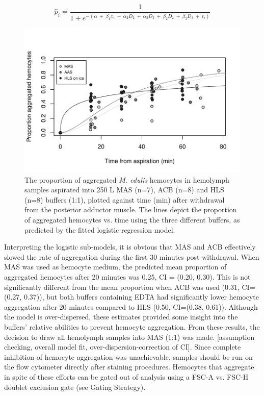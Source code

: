 \begin{equation}
\label{eq:logit}
\hat{p}_{i} = \dfrac{1}{1 + e^{-(\alpha \: + \: \beta_{1} x_{i} \: + \: \alpha_{2} D_{2} \: + \: \alpha_{3} D_{3} \: + \: \beta_{2} D_{2} \: + \: \beta_{3} D_{3} \: + \: \epsilon_{i})}}
\end{equation}

\begin{figure}[!ht]
    \centering
    \includegraphics[width=1.0\textwidth]{figures/greys368.pdf}
    \caption{The proportion of aggregated \emph{M. edulis} hemocytes in hemolymph samples aspirated into 250 \micro L MAS (n=7), ACB (n=8) and HLS (n=8) buffers (1:1), plotted against time (min) after withdrawal from the posterior adductor muscle. The lines depict the proportion of aggregated hemocytes vs. time using the three different buffers, as predicted by the fitted logistic regression model.}
    \label{fig:aggregation}
\end{figure}

Interpreting the logistic sub-models, it is obvious that MAS and ACB effectively slowed the rate of aggregation during the first 30 minutes post-withdrawal. When MAS was used as hemocyte medium, the predicted mean proportion of aggregated hemocytes after 20 minutes was 0.25, CI = (0.20, 0.30). This is not significantly different from the mean proportion when ACB was used (0.31, CI=(0.27, 0.37)), but both buffers containing EDTA had significantly lower hemocyte aggregation after 20 minutes compared to HLS (0.50, CI=(0.38, 0.61)). Although the model is over-dispersed, these estimates provided some insight into the buffers' relative abilities to prevent hemocyte aggregation. From these results, the decision to draw all hemolymph samples into MAS (1:1) was made. [assumption checking, overall model fit, over-dispersion-correction of CI]. Since complete inhibition of hemocyte aggregation was unachievable, samples should be run on the flow cytometer directly after staining procedures. Hemocytes that aggregate in spite of these efforts can be gated out of analysis using a FSC-A vs. FSC-H doublet exclusion gate (see Gating Strategy).

